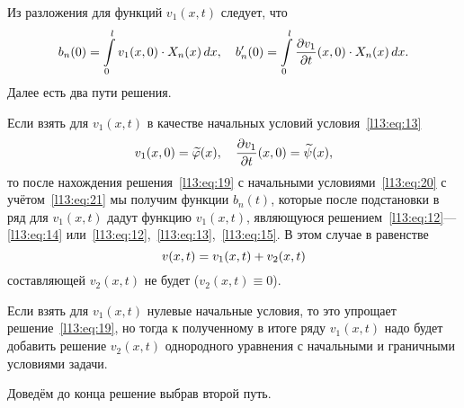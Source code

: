 \documentclass[12pt,a4paper,openany,fleqn]{book}
\newcommand{\pder}[2]{\ensuremath{\frac{\partial#1}{\partial#2}}}
\theoremstyle{definition}
\begin{document}
	Из разложения для функций $v_1(x,t)$ следует, что
	\begin{equation}\label{l13:eq:20}
		\hfill b_n(0)=\int\limits_0^l v_1(x,0)\cdot X_n(x)\,dx,\quad b'_n(0)=\int\limits_0^l \pder{v_1}{t}(x,0)\cdot X_n(x)\,dx.\hfill
	\end{equation}
	Далее есть два пути решения.
	\begin{enumerateD}
		\item Если взять для $v_1(x,t)$ в качестве начальных условий условия~\eqref{l13:eq:13}
		\begin{equation}\label{l13:eq:21}
			\hfill v_1(x,0)=\widetilde{\phi}(x),\quad\pder{v_1}{t}(x,0)=\widetilde{\psi}(x),\hfill
		\end{equation}
		то после нахождения решения~\eqref{l13:eq:19} с начальными условиями~\eqref{l13:eq:20} с учётом~\eqref{l13:eq:21} мы получим функции $b_n(t)$, которые после подстановки в ряд для $v_1(x,t)$ дадут функцию $v_1(x,t)$, являющуюся решением~\eqref{l13:eq:12}---\eqref{l13:eq:14} или~\eqref{l13:eq:12},~\eqref{l13:eq:13},~\eqref{l13:eq:15}. В этом случае в равенстве 
		\begin{equation*}
			\hfill v(x,t)=v_1(x,t)+v_2(x,t)\hfill
		\end{equation*} 
		составляющей $v_2(x,t)$ не будет ($v_2(x,t)\equiv0$).
		\item Если взять для $v_1(x,t)$ нулевые начальные условия, то это упрощает решение~\eqref{l13:eq:19}, но тогда к полученному в итоге ряду $v_1(x,t)$ надо будет добавить решение $v_2(x,t)$ однородного уравнения с начальными и граничными условиями задачи.   
	\end{enumerateD}

	\noindent Доведём до конца решение выбрав второй путь.  
	
\end{document}
